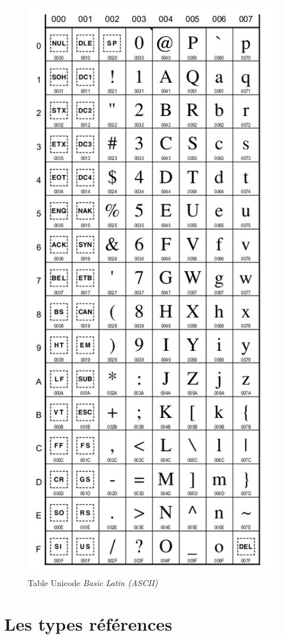 \begin{figure}[p]
	\centering
	\includegraphics[width=.75\linewidth]{../images/unicode-latin-2.png}
	\caption{Table Unicode \textit{Basic Latin (ASCII)}}
	\label{fig:tableunicode}
\end{figure}







\clearpage
{}
\section{Les types références}

